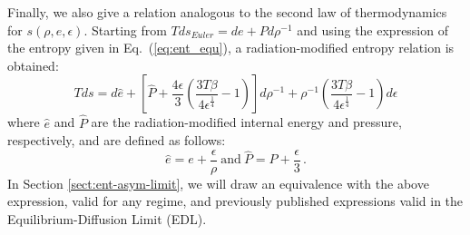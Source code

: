 \documentclass[review]{elsarticle}
\newcommand{\eqt}[1]{Eq.~(\ref{#1})}                     %
\begin{document}
Finally, we also give a relation analogous to the second law of thermodynamics for $s(\rho,e,\epsilon)$. Starting from $Tds_{Euler}= de + P d \rho^{-1}$ and using the expression of the entropy given in \eqt{eq:ent_equ}, a radiation-modified entropy relation is obtained:
%
\begin{equation}\label{eq:ent_relation}
Tds = d\hat{e} + \left[ \hat{P} + \frac{4\epsilon}{3}  \left( \frac{3T \beta}{4\epsilon^\frac{1}{4}} -1\right) \right] d \rho^{-1} + \rho^{-1}\left( \frac{3 T \beta}{4 \epsilon^\frac{1}{4}} -1 \right) d \epsilon
\end{equation}
%
where $\hat{e}$ and $\hat{P}$ are the radiation-modified internal energy and pressure, respectively, and are defined as follows:
%
\begin{equation}\label{eq:rad_mod_var}
\hat{e} = e + \frac{\epsilon}{\rho} \ \text{and} \ \hat{P} = P + \frac{\epsilon}{3} \,.
\end{equation}
%
In Section \ref{sect:ent-asym-limit}, we will draw an equivalence with the above expression, valid for any regime, and previously published expressions valid in the Equilibrium-Diffusion Limit (EDL).

\end{document}
